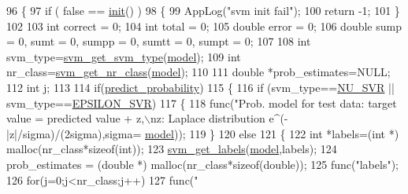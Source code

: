\begin{DoxyCode}
96 \{
97     \textcolor{keywordflow}{if} ( \textcolor{keyword}{false} == \hyperlink{class_svm_wrapper_af06622d63ce23b77ac29aa29298110d7}{init}() )
98     \{
99         AppLog(\textcolor{stringliteral}{"svm init fail"});
100         \textcolor{keywordflow}{return} -1;
101     \}
102 
103     \textcolor{keywordtype}{int} correct = 0;
104     \textcolor{keywordtype}{int} total = 0;
105     \textcolor{keywordtype}{double} error = 0;
106     \textcolor{keywordtype}{double} sump = 0, sumt = 0, sumpp = 0, sumtt = 0, sumpt = 0;
107 
108     \textcolor{keywordtype}{int} svm\_type=\hyperlink{svm_8h_add0a326d36e24044cf958a420d6f4e19}{svm\_get\_svm\_type}(\hyperlink{class_svm_wrapper_a2acad681f29bd8269c5b11aa568222ec}{model});
109     \textcolor{keywordtype}{int} nr\_class=\hyperlink{svm_8h_a73c7339cbc8a38eb9f1e8ad6fbe11ae8}{svm\_get\_nr\_class}(\hyperlink{class_svm_wrapper_a2acad681f29bd8269c5b11aa568222ec}{model});
110 
111     \textcolor{keywordtype}{double} *prob\_estimates=NULL;
112     \textcolor{keywordtype}{int} j;
113 
114     \textcolor{keywordflow}{if}(\hyperlink{class_svm_wrapper_a18cae78dd4b43d0dc1f2e4d2446b3568}{predict\_probability})
115     \{
116         \textcolor{keywordflow}{if} (svm\_type==\hyperlink{svm_8h_a06fc87d81c62e9abb8790b6e5713c55ba9e113c85baa91dc44fe128028e384309}{NU\_SVR} || svm\_type==\hyperlink{svm_8h_a06fc87d81c62e9abb8790b6e5713c55bae8edabc208c6076619bdfb064b68815a}{EPSILON\_SVR})
117         \{
118             func(\textcolor{stringliteral}{"Prob. model for test data: target value = predicted value + z,\(\backslash\)nz: Laplace distribution
       e^(-|z|/sigma)/(2sigma),sigma=%
      \hyperlink{class_svm_wrapper_a2acad681f29bd8269c5b11aa568222ec}{model}));
119         \}
120         \textcolor{keywordflow}{else}
121         \{
122             \textcolor{keywordtype}{int} *labels=(\textcolor{keywordtype}{int} *) malloc(nr\_class*\textcolor{keyword}{sizeof}(\textcolor{keywordtype}{int}));
123             \hyperlink{svm_8h_a1eafdf09b884847a04a72cf22ddb95f2}{svm\_get\_labels}(\hyperlink{class_svm_wrapper_a2acad681f29bd8269c5b11aa568222ec}{model},labels);
124             prob\_estimates = (\textcolor{keywordtype}{double} *) malloc(nr\_class*\textcolor{keyword}{sizeof}(\textcolor{keywordtype}{double}));
125             func(\textcolor{stringliteral}{"labels"});
126             \textcolor{keywordflow}{for}(j=0;j<nr\_class;j++)
127                 func(\textcolor{stringliteral}{" %
}}
\end{DoxyCode}
